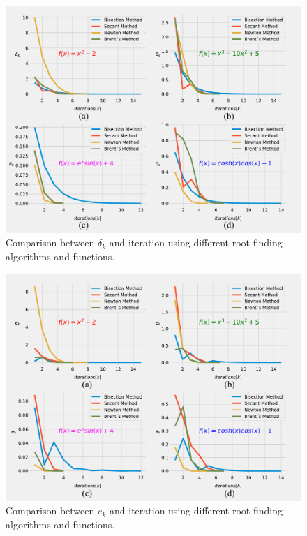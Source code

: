 \documentclass[11pt]{exam}
\begin{document}
\begin{figure}[!h]
	\centering
	\includegraphics[width=12cm]{img/DeltaVsIter.pdf}\caption{Comparison between $\delta_k$ and iteration using different root-finding algorithms and functions. }\label{fig:deltaVsiter}
\end{figure}
\begin{figure}[!h]
	\centering
	\includegraphics[width=12cm]{img/ErrorVsIter.pdf}\caption{Comparison between $e_k$ and iteration using different root-finding algorithms and functions. }\label{fig:errVsiter}
\end{figure}
\end{document}
